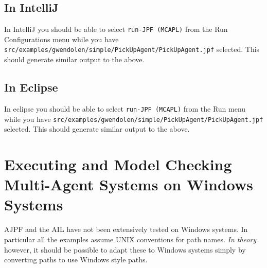 \subsection{In IntelliJ}

In IntelliJ you should be able to select \texttt{run-JPF (MCAPL)} from the Run Configurations menu while you have \texttt{src/examples/gwendolen/simple/PickUpAgent/PickUpAgent.jpf} selected.  This should generate similar output to the above.

\subsection{In Eclipse}

In eclipse you should be able to select \texttt{run-JPF (MCAPL)} from the Run menu while you have \texttt{src/examples/gwendolen/simple/PickUpAgent/PickUpAgent.jpf} selected.  This should generate similar output to the above.

\section{Executing and Model Checking Multi-Agent Systems on Windows Systems}

AJPF and the AIL have not been extensively tested on Windows systems.  In particular all the examples assume UNIX conventions for path names.  \emph{In theory} however, it should be possible to adapt these to Windows systems simply by converting paths to use Windows style paths.
